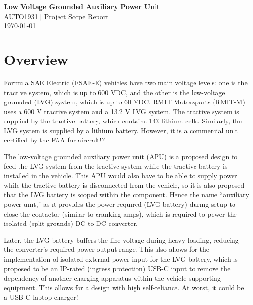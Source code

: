 \documentclass[12pt,a4paper]{article}
\begin{document}
\begin{center}
    {\Large \textbf{Low Voltage Grounded Auxiliary Power Unit}} \\[0.3cm]
    {\large AUTO1931 | Project Scope Report} \\[0.2cm]
    {\today}\\[0.5cm]
\end{center}

\vfill

\section*{Overview}

Formula SAE Electric (FSAE-E) vehicles have two main voltage levels: one is the tractive system, which is up to 600 VDC, and the
other is the low-voltage grounded (LVG) system, which is up to 60 VDC. RMIT Motorsports (RMIT-M) uses a 600 V tractive system and a 13.2 V LVG system.
The tractive system is supplied by the tractive battery, which contains 143 lithium cells. Similarly, the LVG system is supplied by a lithium battery.
However, it is a commercial unit certified by the FAA for aircraft!?

\vspace{0.5cm}

The low-voltage grounded auxiliary power unit (APU) is a proposed design to feed the LVG system from the tractive system while the tractive battery
is installed in the vehicle. This APU would also have to be able to supply power while the tractive battery is disconnected from the vehicle, so it is
also proposed that the LVG battery is scoped within the component. Hence the name ``auxiliary power unit,'' as it provides the power required (LVG battery)
during setup to close the contactor (similar to cranking amps), which is required to power the isolated (split grounds) DC-to-DC converter.

\vspace{0.5cm}

Later, the LVG battery buffers the line voltage during heavy loading, reducing the converter's required power output range. This also allows for the
implementation of isolated external power input for the LVG battery, which is proposed to be an IP-rated (ingress protection) USB-C input to remove the 
dependency of another charging apparatus within the vehicle supporting equipment. This allows for a design with high self-reliance. At worst, it could be a USB-C laptop charger!
\end{document}
